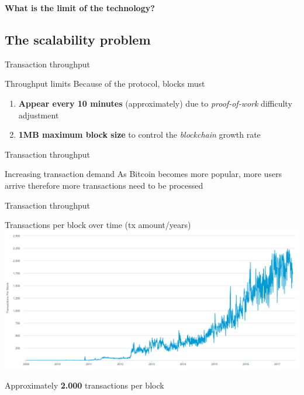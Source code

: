 \documentclass{beamer}
\begin{document}
\begin{frame}
 \begin{center}
  \textbf{What is the limit of the technology?}
 \end{center}
\end{frame}
\subsection{The scalability problem}
\begin{frame}{Transaction throughput}
 \begin{block}{Throughput limits}
  Because of the protocol, blocks must
  \begin{enumerate}
   \item \textbf{Appear every 10 minutes} (approximately) due to \textit{proof-of-work} difficulty adjustment
   \item \textbf{1MB maximum block size} to control the \textit{blockchain} growth rate
  \end{enumerate}
 \end{block}
\end{frame}
\begin{frame}{Transaction throughput}
 \begin{alertblock}{Increasing transaction demand}
  As Bitcoin becomes more popular, more users arrive therefore more transactions need to be processed
 \end{alertblock}
\end{frame}
\begin{frame}{Transaction throughput}
 \begin{center}
  Transactions per block over time (tx amount/years)\\
  \includegraphics[width=\textwidth, height=0.8\textheight, keepaspectratio]{img/chart_block_transactions.png}
 \end{center}
 \begin{center}
  Approximately \textbf{2.000} transactions per block
 \end{center}
\end{frame}
\end{document}

